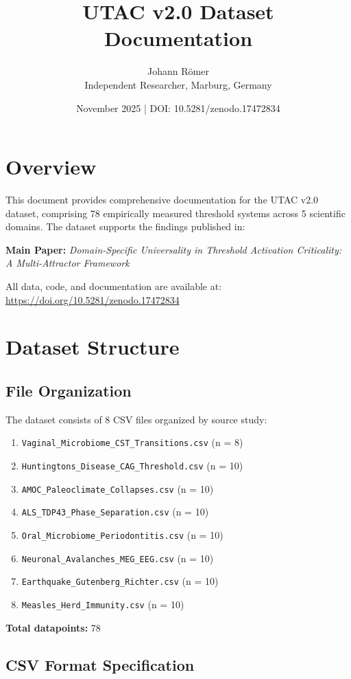 \documentclass[11pt,a4paper]{article}
\title{\textbf{UTAC v2.0 Dataset Documentation}}
\author{Johann Römer \\ Independent Researcher, Marburg, Germany}
\date{November 2025 | DOI: 10.5281/zenodo.17472834}
\begin{document}
\maketitle

\section{Overview}

This document provides comprehensive documentation for the UTAC v2.0 dataset, comprising 78 empirically measured threshold systems across 5 scientific domains. The dataset supports the findings published in:

\textbf{Main Paper:} \textit{Domain-Specific Universality in Threshold Activation Criticality: A Multi-Attractor Framework}

All data, code, and documentation are available at: \url{https://doi.org/10.5281/zenodo.17472834}

\section{Dataset Structure}

\subsection{File Organization}

The dataset consists of 8 CSV files organized by source study:

\begin{enumerate}
\item \texttt{Vaginal\_Microbiome\_CST\_Transitions.csv} (n = 8)
\item \texttt{Huntingtons\_Disease\_CAG\_Threshold.csv} (n = 10)
\item \texttt{AMOC\_Paleoclimate\_Collapses.csv} (n = 10)
\item \texttt{ALS\_TDP43\_Phase\_Separation.csv} (n = 10)
\item \texttt{Oral\_Microbiome\_Periodontitis.csv} (n = 10)
\item \texttt{Neuronal\_Avalanches\_MEG\_EEG.csv} (n = 10)
\item \texttt{Earthquake\_Gutenberg\_Richter.csv} (n = 10)
\item \texttt{Measles\_Herd\_Immunity.csv} (n = 10)
\end{enumerate}

\textbf{Total datapoints:} 78

\subsection{CSV Format Specification}
\end{document}

